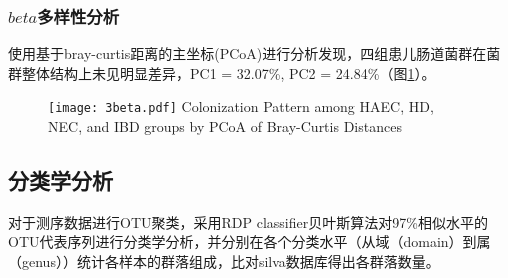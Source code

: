     \subsubsection{$beta$多样性分析}
    使用基于bray-curtis距离的主坐标(PCoA)进行分析发现，四组患儿肠道菌群在菌群整体结构上未见明显差异，PC1 = 32.07\%, PC2 = 24.84\%（图\ref{fig:3beta}）。
      \begin{figure}[!htp]
        \centering
        \texttt{[image: 3beta.pdf]}
          {Colonization Pattern among HAEC, HD, NEC, and IBD groups by PCoA of Bray-Curtis Distances}
        \label{fig:3beta}
      \end{figure}

  \subsection{分类学分析}
  对于测序数据进行OTU聚类，采用RDP classifier贝叶斯算法对97\%相似水平的OTU代表序列进行分类学分析，并分别在各个分类水平（从域（domain）到属（genus））统计各样本的群落组成，比对silva数据库得出各群落数量。
